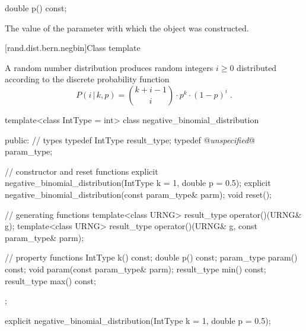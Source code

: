 %
%
\begin{itemdecl}
double p() const;
\end{itemdecl}

\begin{itemdescr}
\pnum\returns The value of the  parameter
 with which the object was constructed.
\end{itemdescr}


[rand.dist.bern.negbin]{Class template }

\pnum
A  random number distribution
produces random integers $i \geq 0$
distributed according to
the discrete probability function
%
\[%
 P(i\,|\,k,p)
      = {k+i-1 \choose i} \cdot p^k \cdot (1-p)^i
\; \mbox{.}
\]

\begin{codeblock}
template<class IntType = int>
 class negative_binomial_distribution
{
public:
 // types
 typedef IntType  result_type;
 typedef @\textit{unspecified}@ param_type;

 // constructor and reset functions
 explicit negative_binomial_distribution(IntType k = 1, double p = 0.5);
 explicit negative_binomial_distribution(const param_type& parm);
 void reset();

 // generating functions
 template<class URNG>
   result_type operator()(URNG& g);
 template<class URNG>
   result_type operator()(URNG& g, const param_type& parm);

 // property functions
 IntType k() const;
 double p() const;
 param_type param() const;
 void param(const param_type& parm);
 result_type min() const;
 result_type max() const;
};
\end{codeblock}


%
\begin{itemdecl}
explicit negative_binomial_distribution(IntType k = 1, double p = 0.5);
\end{itemdecl}

